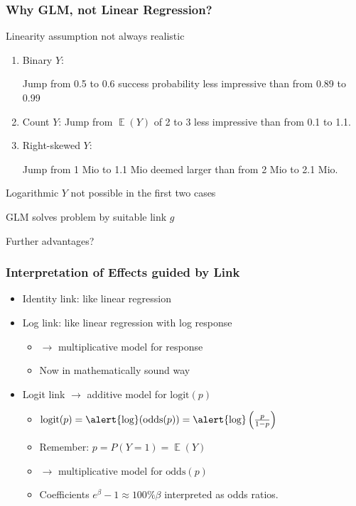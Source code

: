 \documentclass[
    utf8,
    aspectratio=169
]{beamer}  %
\DeclareMathOperator{\E}{\mathbb{E}}  %
\begin{document}
\begin{frame}
	\frametitle{Why GLM, not Linear Regression?}
	\begin{block}{Linearity assumption not always realistic}
		\begin{enumerate}
			\item Binary $Y$: 
			
			Jump from 0.5 to 0.6 success probability less impressive than from 0.89 to 0.99
			\item Count $Y$: Jump from $\E(Y)$ of 2 to 3 less impressive than from 0.1 to 1.1.
			\item Right-skewed $Y$: 
			
			Jump from 1 Mio to 1.1 Mio deemed larger than from 2 Mio to 2.1 Mio.
		\end{enumerate}
	\alert{Logarithmic $Y$ not possible in the first two cases}
	\end{block}
	
	\begin{block}{GLM solves problem by suitable link $g$}
	\end{block}
	
	\begin{block}{Further advantages?}
	\end{block}
\end{frame}

\begin{frame}
	\frametitle{Interpretation of Effects guided by Link}
	\begin{itemize}
		\item Identity link: like linear regression
		\item Log link: like linear regression with log response
			\begin{itemize}
				\item $\rightarrow$ multiplicative model for response
			    \item Now in mathematically sound way
			\end{itemize}
		\item Logit link $\rightarrow$ additive model for $\text{logit}(p)$
			\begin{itemize}
				\item $\text{logit}(p) = \text{\alert{log}}(\text{odds}(p)) = \text{\alert{log}}\left(\frac{p}{1-p}\right)$
				\item Remember: $p = P(Y=1) = \E(Y)$				
				\item $\rightarrow$ multiplicative model for $\text{odds}(p)$
				\item Coefficients \alert{$e^\beta - 1 \approx 100\%\beta$} interpreted as odds ratios.
			\end{itemize}
	\end{itemize}
\end{frame}
\end{document}
